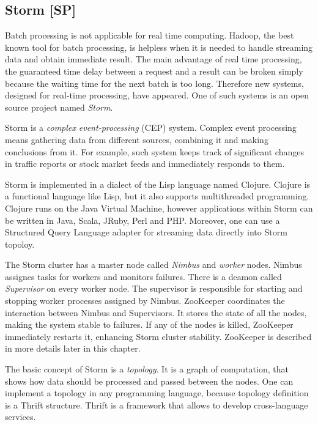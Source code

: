 \subsection{Storm [SP]}

Batch processing is not applicable for real time computing.
Hadoop, the best known tool for batch processing, is helpless when it is needed to handle streaming data and obtain immediate result.
The main advantage of real time processing, the guaranteed time delay between a request and a result can be broken simply because the waiting time for the next batch is too long.
Therefore new systems, designed for real-time processing, have appeared.
One of such systems is an open source project named \textit{Storm}.

Storm is a \textit{complex event-processing} (CEP) system.
Complex event processing means gathering data from different sources, combining it and making conclusions from it.
For example, such system keeps track of significant changes in traffic reports or stock market feeds and immediately responds to them. 

Storm is implemented in a dialect of the Lisp language named Clojure.
Clojure is a functional language like Lisp, but it also supports multithreaded programming.
Clojure runs on the Java Virtual Machine, however applications within Storm can be written in Java, Scala, JRuby, Perl and PHP.
Moreover, one can use a Structured Query Language adapter for streaming data directly into Storm topoloy.

The Storm cluster has a master node called \textit{Nimbus} and \textit{worker} nodes.
Nimbus assignes tasks for workers and monitors failures.
There is a deamon called \textit{Supervisor} on every worker node.
The supervisor is responsible for starting and stopping worker processes assigned by Nimbus.
ZooKeeper coordinates the interaction between Nimbus and Supervisors.
It stores the state of all the nodes, making the system stable to failures.
If any of the nodes is killed, ZooKeeper immediately restarts it, enhancing Storm cluster stability.
ZooKeeper is described in more details later in this chapter.

The basic concept of Storm is a \textit{topology}.
It is a graph of computation, that shows how data should be processed and passed between the nodes.
One can implement a topology in any programming language, because topology definition is a Thrift structure.
Thrift is a framework that allows to develop cross-language services.	

